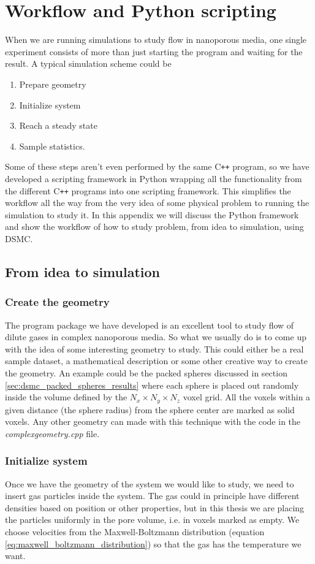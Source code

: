 \chapter{Workflow and Python scripting}
When we are running simulations to study flow in nanoporous media, one single experiment consists of more than just starting the program and waiting for the result. A typical simulation scheme could be
\begin{enumerate}
	\item Prepare geometry
	\item Initialize system
	\item Reach a steady state
	\item Sample statistics.
\end{enumerate}
Some of these steps aren't even performed by the same C{}\verb!++! program, so we have developed a scripting framework in Python wrapping all the functionality from the different C{}\verb!++! programs into one scripting framework. This simplifies the workflow all the way from the very idea of some physical problem to running the simulation to study it. In this appendix we will discuss the Python framework and show the workflow of how to study problem, from idea to simulation, using DSMC.
\section{From idea to simulation}
\subsection{Create the geometry}
The program package we have developed is an excellent tool to study flow of dilute gases in complex nanoporous media. So what we usually do is to come up with the idea of some interesting geometry to study. This could either be a real sample dataset, a mathematical description or some other creative way to create the geometry. An example could be the packed spheres discussed in section \ref{sec:dsmc_packed_spheres_results} where each sphere is placed out randomly inside the volume defined by the $N_x\times N_y \times N_z$ voxel grid. All the voxels within a given distance (the sphere radius) from the sphere center are marked as solid voxels. Any other geometry can made with this technique with the code in the \textit{complexgeometry.cpp} file. 
\subsection{Initialize system}
Once we have the geometry of the system we would like to study, we need to insert gas particles inside the system. The gas could in principle have different densities based on position or other properties, but in this thesis we are placing the particles uniformly in the pore volume, i.e. in voxels marked as empty. We choose velocities from the Maxwell-Boltzmann distribution (equation \eqref{eq:maxwell_boltzmann_distribution}) so that the gas has the temperature we want.
